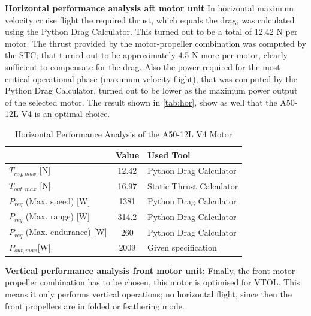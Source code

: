 {\noindent \textbf{Horizontal performance analysis aft motor unit}
In horizontal maximum velocity cruise flight the required thrust, which equals the drag, was calculated using the Python Drag Calculator. This turned out to be a total of 12.42 N per motor. The thrust provided by the motor-propeller combination was computed by the STC; that turned out to be approximately 4.5 N more per motor, clearly sufficient to compensate for the drag. Also the power required for the most critical operational phase (maximum velocity flight), that was computed by the Python Drag Calculator, turned out to be lower as the maximum power output of the selected motor. The result shown in \autoref{tab:hor}, show as well that the A50-12L V4 is an optimal choice.

\begin{table}[H]
\centering
\caption{Horizontal Performance Analysis of the A50-12L V4 Motor}
\label{tab:hor}
    \begin{tabular}{lcl}
    \toprule
                              &\bfseries Value  &\bfseries Used Tool                     \\ \midrule
    $T_{req,max}$  {[}N{]}         & 12.42  & Python Drag Calculator        \\\hdashline
    $T_{out,max}$ {[}N{]}              & 16.97  & Static Thrust Calculator \\\hdashline
    $P_{req}$ (Max. speed) {[}W{]}  & 1381 & Python Drag Calculator        \\\hdashline
    $P_{req}$ (Max. range) {[}W{]}       & 314.2  & Python Drag Calculator        \\\hdashline
    $P_{req}$ (Max. endurance) {[}W{]}  & 260    & Python Drag Calculator        \\\hdashline
    $P_{out,max}${[}W{]}            & 2009   & Given specification 
        \\\bottomrule
    \end{tabular}
\end{table}

\noindent \textbf{Vertical performance analysis front motor unit:}
Finally, the front motor-propeller combination has to be chosen, this motor is optimised for VTOL. This means it only performs vertical operations; no horizontal flight, since then the front propellers are in folded or feathering mode.

}
